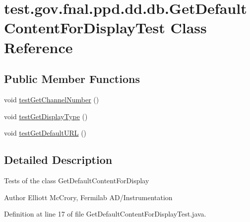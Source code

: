 \hypertarget{classtest_1_1gov_1_1fnal_1_1ppd_1_1dd_1_1db_1_1GetDefaultContentForDisplayTest}{\section{test.\-gov.\-fnal.\-ppd.\-dd.\-db.\-Get\-Default\-Content\-For\-Display\-Test Class Reference}
\label{classtest_1_1gov_1_1fnal_1_1ppd_1_1dd_1_1db_1_1GetDefaultContentForDisplayTest}
}
\subsection*{Public Member Functions}
\begin{DoxyCompactItemize}
\item 
void \hyperlink{classtest_1_1gov_1_1fnal_1_1ppd_1_1dd_1_1db_1_1GetDefaultContentForDisplayTest_a537c7cee8b9dbb1afadb523af89feda6}{test\-Get\-Channel\-Number} ()
\item 
void \hyperlink{classtest_1_1gov_1_1fnal_1_1ppd_1_1dd_1_1db_1_1GetDefaultContentForDisplayTest_a949d9e3ff3f8fea11b3cdee4bc8860e4}{test\-Get\-Display\-Type} ()
\item 
void \hyperlink{classtest_1_1gov_1_1fnal_1_1ppd_1_1dd_1_1db_1_1GetDefaultContentForDisplayTest_a5e31b72bf0bf1b903d7280366872a11e}{test\-Get\-Default\-U\-R\-L} ()
\end{DoxyCompactItemize}


\subsection{Detailed Description}
Tests of the class Get\-Default\-Content\-For\-Display

\begin{DoxyAuthor}{Author}
Elliott Mc\-Crory, Fermilab A\-D/\-Instrumentation 
\end{DoxyAuthor}


Definition at line 17 of file Get\-Default\-Content\-For\-Display\-Test.\-java.



